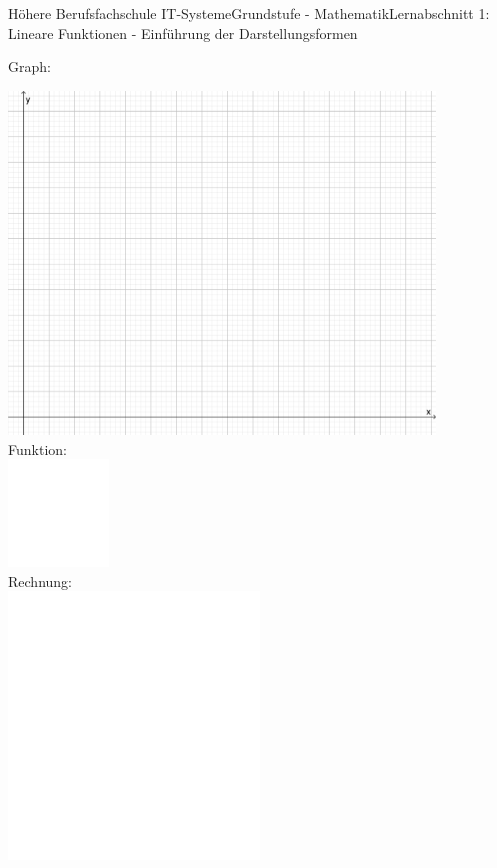 \documentclass[oneside,openany,headings=optiontotoc,11pt,numbers=noenddot]{scrreprt}
\begin{document}
\begin{worksheet}{Höhere Berufsfachschule IT-Systeme}{Grundstufe - Mathematik}{Lernabschnitt 1: Lineare Funktionen - Einführung der Darstellungsformen}
\begin{framed}
			\small{\color{codegray}Graph:}\\
			\par\noindent
			\includegraphics[width=0.85\textwidth]{../99_Bilder/KoordLeer.png}\\
			\small{\color{codegray}Funktion:}\\
			\includegraphics[width=0.2\textwidth]{../../empty.jpg}\\
			\small{\color{codegray}Rechnung:}\\
			\includegraphics[width=0.5\textwidth]{../../empty.jpg}\\
		\end{framed}
		\begin{framed}
			\begin{tabularx}{\textwidth}{X|X}

\end{tabularx}
\end{framed}
\end{worksheet}
\end{document}
